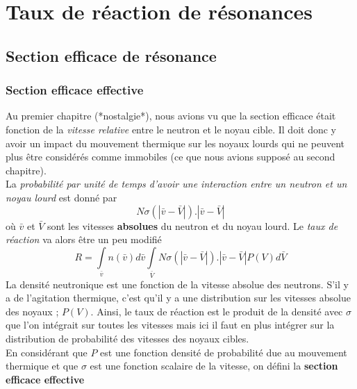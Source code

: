 \chapter{Taux de réaction de résonances}
\section{Section efficace de résonance}
	\subsection{Section efficace effective}
	Au premier chapitre (*nostalgie*), nous avions vu que la section efficace était fonction de la
	\textit{vitesse relative} entre le neutron et le noyau cible. Il doit donc y avoir un impact du 
	mouvement thermique sur les noyaux lourds qui ne peuvent plus être considérés comme immobiles 
	(ce que nous avions supposé au second chapitre).\\
	
	La \textit{probabilité par unité de temps d'avoir une interaction entre un neutron et un noyau 
	lourd} est donné par
	\begin{equation}
	N\sigma (|\bar v - \bar V|).|\bar v - \bar V|
	\end{equation}
	où $\bar v$ et $\bar V$ sont les vitesses \textbf{absolues} du neutron et du noyau lourd. Le 
	\textit{taux de réaction} va alors être un peu modifié 
	\begin{equation}
	R = \int\limits_{\bar v}  n(\bar v)d\bar v\int\limits_{\bar V}  N\sigma (|\bar v - \bar V|).|\bar v
	 - \bar V|P(V)d\bar V
	\end{equation}
	La densité neutronique est une fonction de la vitesse absolue des neutrons. S'il y a de 
	l'agitation thermique, c'est qu'il y a une distribution sur les vitesses absolue des noyaux ;
	$P(V)$. Ainsi, le taux de réaction est le produit de la densité avec $\sigma$ que l'on intégrait
	sur toutes les vitesses mais ici il faut en plus intégrer sur la distribution de probabilité des
	vitesses des noyaux cibles. \\
	
	En considérant que $P$ est une fonction densité de probabilité due au mouvement thermique et que
	$\sigma$ est une fonction scalaire de la vitesse, on défini la \textbf{section efficace
	effective}\ \\
	
	\ 
	
